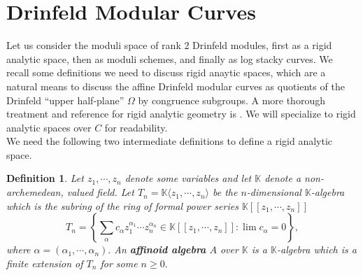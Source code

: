 \documentclass[11pt]{amsart}
\newtheorem{definition}[theorem]{Definition}
\newtheorem{example}[theorem]{Example}
\theoremstyle{definition}
\numberwithin{equation}{section}
\newcommand{\GL}{\mathrm{GL}} 	%
\newcommand{\bbA}{\mathbb{A}}		%
\newcommand{\bbK}{\mathbb{K}}		%
\begin{document}
		\section{Drinfeld Modular Curves}
		
		Let us consider the moduli space of rank $2$ Drinfeld modules, first as a rigid analytic space, then as moduli schemes, and finally as log stacky curves. We recall some definitions we need to discuss rigid anaytic spaces, which are a natural means to discuss the affine Drinfeld modular curves as quotients of the Drinfeld ``upper half-plane'' $\Omega$ by congruence subgroups. A more thorough treatment and reference for rigid analytic geometry is \cite{Frensel-vanderPut-Rigid-Analytic_Geom}. We will specialize to rigid analytic spaces over $C$ for readability.\\
		
		We need the following two intermediate definitions to define a rigid analytic space. 
		\begin{definition}%
			Let $z_1,\cdots, z_n$ denote some variables and let $\bbK$ denote a non-archemedean, valued field. Let $T_n=\bbK\langle z_1,\cdots, z_n\rangle$ be the $n$-dimensional $\bbK$-algebra which is the subring of the ring of formal power series $\bbK[\![z_1,\cdots, z_n]\!]$ 
			\[T_n=\left\{\sum_{\alpha} c_{\alpha}z_1^{\alpha_1}\cdots z_n^{\alpha_n}\in \bbK[\![z_1,\cdots, z_n]\!] :\lim c_{\alpha}=0\right\},\] 
			where $\alpha = (\alpha_1,\cdots,\alpha_n).$ An \textbf{affinoid algebra} $A$ over $\bbK$ is a $\bbK$-algebra which is a finite extension of $T_n$ for some $n\geq 0.$
		\end{definition} 
		
\end{document}
